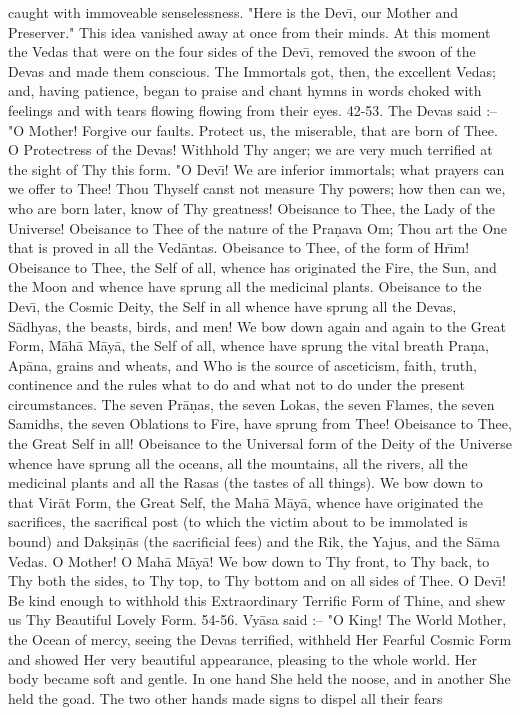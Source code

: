 caught with immoveable senselessness. "Here is the Dev\={\i}, our Mother and Preserver." This idea vanished away at once from their minds.
At this moment the Vedas that were on the four sides of the Dev\={\i}, removed the swoon of the Devas and made them conscious. The Immortals got, then, the excellent Vedas; and, having patience, began to praise and chant hymns in words choked with feelings and with tears flowing flowing from their eyes.
42-53. The Devas said :-- "O Mother! Forgive our faults. Protect us, the miserable, that are born of Thee. O Protectress of the Devas! Withhold Thy anger; we are very much terrified at the sight of Thy this form. "O Dev\={\i}! We are inferior immortals; what prayers can we offer to Thee! Thou Thyself canst not measure Thy powers; how then can we, who are born later, know of Thy greatness! Obeisance to Thee, the Lady of the Universe! Obeisance to Thee of the nature of the Pra\d{n}ava Om; Thou art the One that is proved in all the Ved\=antas. Obeisance to Thee, of the form of Hr\={\i}m! Obeisance to Thee, the Self of all, whence has originated the Fire, the Sun, and the Moon and whence have sprung all the medicinal plants. Obeisance to the Dev\={\i}, the Cosmic Deity, the Self in all whence have sprung all the Devas, S\=adhyas, the beasts, birds, and men! We bow down again and again to the Great Form, M\=ah\=a M\=ay\=a, the Self of all, whence have sprung the vital breath Pra\d{n}a, Ap\=ana, grains and wheats, and Who is the source of asceticism, faith, truth, continence and the rules what to do and what not to do under the present circumstances. The seven Pr\=a\d{n}as, the seven Lokas, the seven Flames, the seven Samidhs, the seven Oblations to Fire, have sprung from Thee! Obeisance to Thee, the Great Self in all! Obeisance to the Universal form of the Deity of the Universe whence have sprung all the oceans, all the mountains, all the rivers, all the medicinal plants and all the Rasas (the tastes of all things). We bow down to that Vir\=at Form, the Great Self, the Mah\=a M\=ay\=a, whence have originated the sacrifices, the sacrifical post (to which the victim about to be immolated is bound) and Dak\d{s}i\d{n}\=as (the sacrificial fees) and the Rik, the Yajus, and the S\=ama Vedas. O Mother! O Mah\=a M\=ay\=a! We bow down to Thy front, to Thy back, to Thy both the sides, to Thy top, to Thy bottom and on all sides of Thee. O Dev\={\i}! Be kind enough to withhold this Extraordinary Terrific Form of Thine, and shew us Thy Beautiful Lovely Form.
54-56. Vy\=asa said :-- "O King! The World Mother, the Ocean of mercy, seeing the Devas terrified, withheld Her Fearful Cosmic Form and showed Her very beautiful appearance, pleasing to the whole world. Her body became soft and gentle. In one hand She held the noose, and in another She held the goad. The two other hands made signs to dispel all their fears

